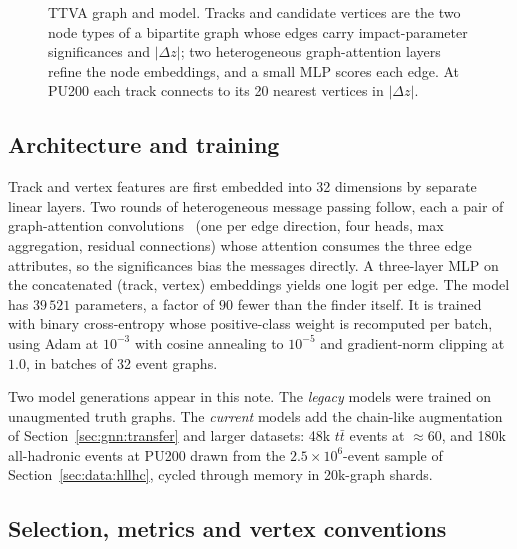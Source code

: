 \begin{figure}[t]
{}
  \caption{TTVA graph and model. Tracks and candidate vertices are the two node
  types of a bipartite graph whose edges carry impact-parameter significances
  and $|\Delta z|$; two heterogeneous graph-attention layers refine the node
  embeddings, and a small MLP scores each edge. At PU200 each track connects to
  its 20 nearest vertices in $|\Delta z|$.}
  \label{fig:gnn_graph}
\end{figure}

\subsection{Architecture and training}
\label{sec:gnn:arch}

Track and vertex features are first embedded into 32 dimensions by separate
linear layers. Two rounds of heterogeneous message passing follow, each a pair
of graph-attention convolutions~\cite{velivckovic2017graph} (one per edge
direction, four heads, max aggregation, residual connections) whose attention
consumes the three edge attributes, so the significances bias the messages
directly. A three-layer MLP on the concatenated (track, vertex) embeddings
yields one logit per edge. The model has $39\,521$ parameters, a factor of
$90$ fewer than the \pvf{} finder itself. It is trained with binary
cross-entropy whose positive-class weight is recomputed per batch, using
Adam at $10^{-3}$ with cosine annealing to $10^{-5}$ and gradient-norm
clipping at $1.0$, in batches of 32 event graphs.

Two model generations appear in this note. The \emph{legacy} models were
trained on unaugmented truth graphs. The \emph{current} models add the
chain-like augmentation of Section~\ref{sec:gnn:transfer} and larger
datasets: 48k $t\bar{t}$ events at \muavg{}$\approx$60, and 180k all-hadronic
events at PU200 drawn from the $2.5\times10^{6}$-event sample of
Section~\ref{sec:data:hllhc}, cycled through memory in 20k-graph shards.

\subsection{Selection, metrics and vertex conventions}
\label{sec:gnn:metrics}

